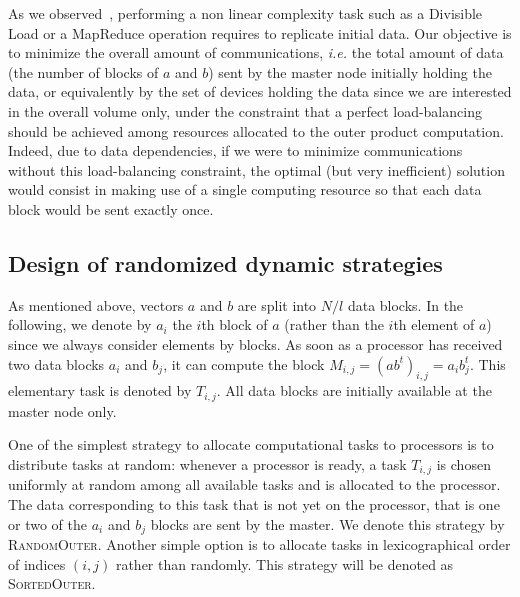 \documentclass[a4paper,10pt]{article}
\newcommand{\ie}{{\it i.e.}\xspace}
\newcommand{\simplerandom}{\textsc{Random\-Outer}\xspace}
\newcommand{\simplesorted}{\textsc{Sorted\-Outer}\xspace}
\begin{document}
As we observed~\cite{nofreelunch}, performing a non linear complexity
task such as a Divisible Load or a MapReduce operation requires to
replicate initial data. Our objective is to minimize the overall
amount of communications, \ie the total amount of data (the number of
blocks of $a$ and $b$) sent by the master node initially holding the data,
or equivalently by the set of devices holding the data since we are
interested in the overall volume only, under the constraint that a
perfect load-balancing should be achieved among resources allocated to
the outer product computation. Indeed, due to data dependencies, if we
were to minimize communications without this load-balancing
constraint, the optimal (but very inefficient) solution would consist in
making use of a single computing resource so that each data block would be
sent exactly once.


\subsection{Design of randomized dynamic strategies}

As mentioned above, vectors $a$ and $b$ are split into $N/l$ data
blocks. In the following, we denote by $a_i$ the $i$th block of $a$
(rather than the $i$th element of $a$) since we always consider
elements by blocks. As soon as a processor has received two data
blocks $a_i$ and $b_j$, it can compute the block $M_{i,j}=(a
b^t)_{i,j}=a_i b_j^t$. This elementary task is denoted
by $T_{i,j}$. All data blocks are initially available at the master
node only.


One of the simplest strategy to allocate computational tasks to
processors is to distribute tasks at random: whenever a processor is
ready, a task $T_{i,j}$ is chosen uniformly at random among all
available tasks and is allocated to the processor. The data
corresponding to this task that is not yet on the processor, that is
one or two of the $a_i$ and $b_j$ blocks are sent by the master.  We
denote this strategy by \simplerandom.
Another simple option is to allocate tasks in
lexicographical order of indices $(i,j)$ rather than randomly. This strategy will be denoted as
\simplesorted.
\end{document}
